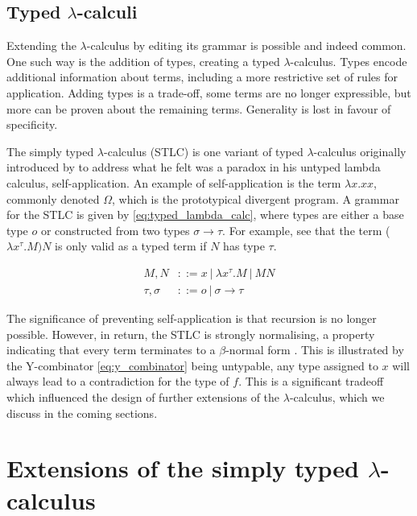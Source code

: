 \documentclass[12pt,a4paper]{report}
\theoremstyle{definition}
\theoremstyle{definition}
\theoremstyle{remark}
\begin{document}
\subsection{Typed \texorpdfstring{$\lambda$}{lambda}-calculi}
Extending the $\lambda$-calculus by editing its grammar is possible and indeed common. One such way is the addition of types, creating a typed $\lambda$-calculus. Types encode additional information about terms, including a more restrictive set of rules for application. Adding types is a trade-off, some terms are no longer expressible, but more can be proven about the remaining terms. Generality is lost in favour of specificity.

The simply typed $\lambda$-calculus (STLC) is one variant of typed $\lambda$-calculus originally introduced by \cite{church_1940} to address what he felt was a paradox in his untyped lambda calculus, self-application. An example of self-application is the term $\lambda x.xx$, commonly denoted $\Omega$, which is the prototypical divergent program. A grammar for the STLC is given by \eqref{eq:typed_lambda_calc}, where types are either a base type $o$ or constructed from two types $\sigma \rightarrow \tau$. For example, see that the term ($\lambda x^{\tau}.M)N$ is only valid as a typed term if $N$ has type $\tau$.

\begin{equation} \label{eq:typed_lambda_calc}
\begin{split}
    M,N &::=x\ |\ \lambda x^{\tau} .M\ |\ MN\\
    \tau , \sigma &::= o\ |\ \sigma \rightarrow \tau
\end{split}
\end{equation}

The significance of preventing self-application is that recursion is no longer possible. However, in return, the STLC is strongly normalising, a property indicating that every term terminates to a $\beta$-normal form \citep{tait_1967}. This is illustrated by the Y-combinator \eqref{eq:y_combinator} being untypable, any type assigned to $x$ will always lead to a contradiction for the type of $f$. This is a significant tradeoff which influenced the design of further extensions of the $\lambda$-calculus, which we discuss in the coming sections.

\section{Extensions of the simply typed \texorpdfstring{$\lambda$}{lambda}-calculus}
\end{document}

